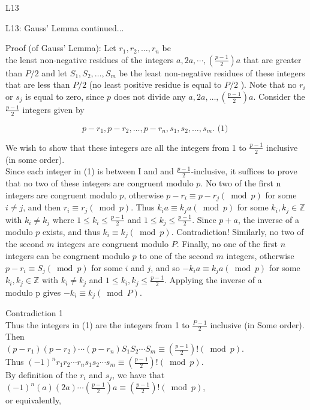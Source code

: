 \documentclass[10pt]{article}
\begin{document}
L13

L13: Gauss' Lemma continued...

Proof (of Gauss' Lemma): Let $r_{1}, r_{2}, \ldots, r_{n}$ be\\
the lenst non-negative residues of the integers $a, 2 a, \cdots,\left(\frac{p-1}{2}\right) a$ that are greater than $P / 2$ and let $S_{1}, S_{2}, \ldots, S_{m}$ be the least non-negative residues of these integers that are less than $P / 2$ (no least positive residue is equal to $P / 2$ ). Note that no $r_{i}$ or $s_{j}$ is equal to zero, since $p$ does not divide any $a, 2 a, \ldots,\left(\frac{p-1}{2}\right) a$. Consider the $\frac{p-1}{2}$ integers given by

$$
p-r_{1}, p-r_{2}, \ldots, p-r_{n}, s_{1}, s_{2}, \ldots, s_{m} \text {. (1) }
$$

We wish to show that these integers are all the integers from 1 to $\frac{p-1}{2}$ inclusive (in some order).\\
Since each integer in (1) is between I and and $\frac{p-1}{2}$-inclusive, it suffices to prove\\
that no two of these integers are congruent modulo $p$. No two of the first n integers are congruent modulo $p$, otherwise $p-r_{i} \equiv p-r_{j}(\bmod p)$ for some $i \neq j$, and then $r_{i} \equiv r_{j}(\bmod p)$. Thus $k_{i} a \equiv k_{j} a(\bmod p)$ for some $k_{i}, k_{j} \in \mathbb{Z}$ with $k_{i} \neq k_{j}$ where $1 \leqslant k_{i} \leqslant \frac{p-1}{2}$ and $1 \leqslant k_{j} \leqslant \frac{p-1}{2}$. Since $p+a$, the inverse of a modulo $p$ exists, and thus $k_{i} \equiv k_{j}(\bmod p)$. Contradiction! Similarly, no two of the second $m$ integers are congruent modulo $P$. Finally, no one of the first $n$ integers can be congrnent modulo $p$ to one of the second $m$ integers, otherwise $p-r_{i} \equiv S_{j}(\bmod p)$ for some $i$ and $j$, and so $-k_{i} a \equiv k_{j} a(\bmod p)$ for some $k_{i}, k_{j} \in \mathbb{Z}$ with $k_{i} \neq k_{j}$ and $1 \leqslant k_{i}, k_{j} \leqslant \frac{p-1}{2}$. Applying the inverse of a\\
modulo p gives $-k_{i} \equiv k_{j}(\bmod P)$.

Contradiction 1\\
Thus the integers in (1) are the integers from 1 to $\frac{P-1}{2}$ inclusive (in Some order). Then\\
$\left(p-r_{1}\right)\left(p-r_{2}\right) \cdots\left(p-r_{n}\right) S_{1} S_{2} \cdots S_{m} \equiv\left(\frac{p-1}{2}\right)!(\bmod p)$.\\
Thus $(-1)^{n} r_{1} r_{2} \cdots r_{n} s_{1} s_{2} \cdots s_{m} \equiv\left(\frac{p-1}{2}\right)!(\bmod p)$.\\
By definition of the $r_{i}$ and $s_{j}$, we have that $(-1)^{n}(a)(2 a) \cdots\left(\frac{p-1}{2}\right) a \equiv\left(\frac{p-1}{2}\right)!(\bmod p)$,\\
or equivalently,
\end{document}

